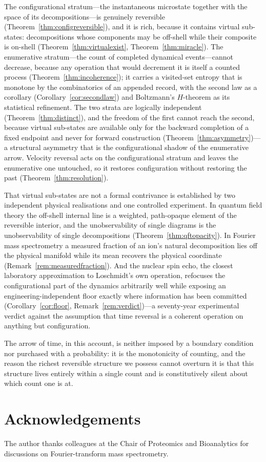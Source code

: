 \documentclass[11pt,a4paper]{article}
\theoremstyle{thmstyle}
\theoremstyle{definition}
\theoremstyle{remark}
\begin{document}
The configurational stratum---the instantaneous microstate together with
the space of its decompositions---is genuinely reversible
(Theorem~\ref{thm:configreversible}), and it is rich, because it contains
virtual sub-states: decompositions whose components may be off-shell while
their composite is on-shell (Theorem~\ref{thm:virtualexist},
Theorem~\ref{thm:miracle}). The enumerative stratum---the count of
completed dynamical events---cannot decrease, because any operation that
would decrement it is itself a counted process
(Theorem~\ref{thm:incoherence}); it carries a visited-set entropy that is
monotone by the combinatorics of an appended record, with the second law as
a corollary (Corollary~\ref{cor:secondlaw}) and Boltzmann's $H$-theorem as
its statistical refinement. The two strata are logically independent
(Theorem~\ref{thm:distinct}), and the freedom of the first cannot reach the
second, because virtual sub-states are available only for the backward
completion of a fixed endpoint and never for forward construction
(Theorem~\ref{thm:asymmetry})---a structural asymmetry that is the
configurational shadow of the enumerative arrow. Velocity reversal acts on
the configurational stratum and leaves the enumerative one untouched, so it
restores configuration without restoring the past
(Theorem~\ref{thm:resolution}).

That virtual sub-states are not a formal contrivance is established by two
independent physical realisations and one controlled experiment. In
quantum field theory the off-shell internal line is a weighted, path-opaque
element of the reversible interior, and the unobservability of single
diagrams is the unobservability of single decompositions
(Theorem~\ref{thm:qftopacity}). In Fourier mass spectrometry a measured
fraction of an ion's natural decomposition lies off the physical manifold
while its mean recovers the physical coordinate
(Remark~\ref{rem:measuredfraction}). And the nuclear spin echo, the closest
laboratory approximation to Loschmidt's own operation, refocuses the
configurational part of the dynamics arbitrarily well while exposing an
engineering-independent floor exactly where information has been committed
(Corollary~\ref{cor:floor}, Remark~\ref{rem:verdict})---a seventy-year
experimental verdict against the assumption that time reversal is a coherent
operation on anything but configuration.

The arrow of time, in this account, is neither imposed by a boundary
condition nor purchased with a probability: it is the monotonicity of
counting, and the reason the richest reversible structure we possess cannot
overturn it is that this structure lives entirely within a single count and
is constitutively silent about which count one is at.

\section*{Acknowledgements}
The author thanks colleagues at the Chair of Proteomics and Bioanalytics
for discussions on Fourier-transform mass spectrometry.



\end{document}
